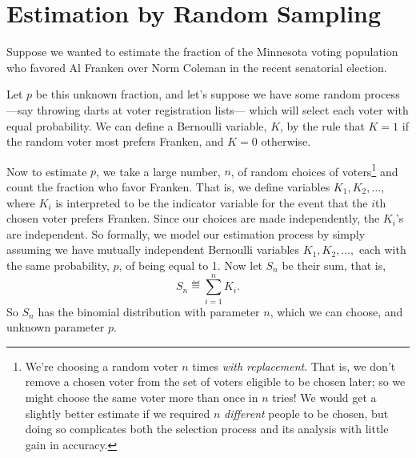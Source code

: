 \section{Estimation by Random Sampling}

Suppose we wanted to estimate the fraction of the Minnesota voting
population who favored Al Franken over Norm Coleman in the recent
senatorial election.

Let $p$ be this unknown fraction, and let's suppose we have some random
process ---say throwing darts at voter registration lists--- which will
select each voter with equal probability.  We can define a Bernoulli
variable, $K$, by the rule that $K=1$ if the random voter most prefers
Franken, and $K=0$ otherwise.

Now to estimate $p$, we take a large number, $n$, of random choices of
voters\footnote{We're choosing a random voter $n$ times \emph{with
replacement}.  That is, we don't remove a chosen voter from the set of
voters eligible to be chosen later; so we might choose the same voter more
than once in $n$ tries!  We would get a slightly better estimate if we
required $n$ \emph{different} people to be chosen, but doing so complicates
both the selection process and its analysis with little gain in accuracy.}
and count the fraction who favor Franken.  That is, we define variables $K_1,
K_2, \dots$, where $K_i$ is interpreted to be the indicator variable for
the event that the $i$th chosen voter prefers Franken.  Since our choices are
made independently, the $K_i$'s are independent.  So formally, we model our
estimation process by simply assuming we have mutually independent
Bernoulli variables $K_1, K_2, \dots,$ each with the same probability, $p$,
of being equal to 1.  Now let $S_n$ be their sum, that is,
\begin{equation}\label{LN12:Sn}
S_n \eqdef \sum_{i=1}^n K_i.
\end{equation}
So $S_n$ has the binomial distribution with parameter $n$, which we can
choose, and unknown parameter $p$.

